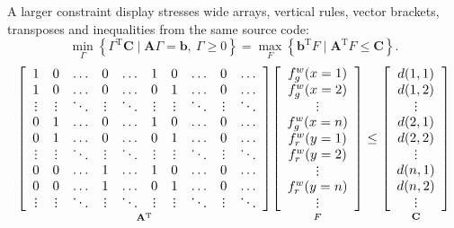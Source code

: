 \documentclass[11pt]{article}
\newcommand{\mcthdots}{.\,.\,.}
\newcommand{\mctvdots}{\mathinner{\vcenter{\offinterlineskip\hbox{.}\kern.18em\hbox{.}\kern.18em\hbox{.}}}}
\newcommand{\mctddots}{\mathinner{\vcenter{\offinterlineskip\hbox{.}\kern.18em\hbox{\kern.45em.}\kern.18em\hbox{\kern.9em.}}}}
\begin{document}
A larger constraint display stresses wide arrays, vertical rules, vector
brackets, transposes and inequalities from the same source code:
\[
  \min_{\Gamma}\left\{\Gamma^{\mathrm T}\mathbf{C}\;|\;
  \mathbf{A}\Gamma=\mathbf{b},\ \Gamma\geq0\right\}
  =
  \max_{F}\left\{\mathbf{b}^{\mathrm T}F\;|\;
  \mathbf{A}^{\mathrm T}F\leq\mathbf{C}\right\}.
\]
\[
\resizebox{\textwidth}{!}{$\displaystyle
\underset{\mathbf{A}^{\mathrm T}}{
\left[
\begin{array}{cccccccccc}
1&0&\mcthdots&0&\mcthdots&1&0&\mcthdots&0&\mcthdots\\
1&0&\mcthdots&0&\mcthdots&0&1&\mcthdots&0&\mcthdots\\
\mctvdots&\mctvdots&\mctddots&\mctvdots&\mctddots&\mctvdots&\mctvdots&\mctddots&\mctvdots&\mctddots\\
0&1&\mcthdots&0&\mcthdots&1&0&\mcthdots&0&\mcthdots\\
0&1&\mcthdots&0&\mcthdots&0&1&\mcthdots&0&\mcthdots\\
\mctvdots&\mctvdots&\mctddots&\mctvdots&\mctddots&\mctvdots&\mctvdots&\mctddots&\mctvdots&\mctddots\\
0&0&\mcthdots&1&\mcthdots&1&0&\mcthdots&0&\mcthdots\\
0&0&\mcthdots&1&\mcthdots&0&1&\mcthdots&0&\mcthdots\\
\mctvdots&\mctvdots&\mctddots&\mctvdots&\mctddots&\mctvdots&\mctvdots&\mctddots&\mctvdots&\mctddots
\end{array}
\right]}
\underset{F}{
\left[
\begin{array}{c}
f_g^w(x=1)\\
f_g^w(x=2)\\
\mctvdots\\
f_g^w(x=n)\\
f_r^w(y=1)\\
f_r^w(y=2)\\
\mctvdots\\
f_r^w(y=n)\\
\mctvdots
\end{array}
\right]}
\leq
\underset{\mathbf{C}}{
\left[
\begin{array}{c}
d(1,1)\\
d(1,2)\\
\mctvdots\\
d(2,1)\\
d(2,2)\\
\mctvdots\\
d(n,1)\\
d(n,2)\\
\mctvdots
\end{array}
\right]}
$}
\]
\end{document}
